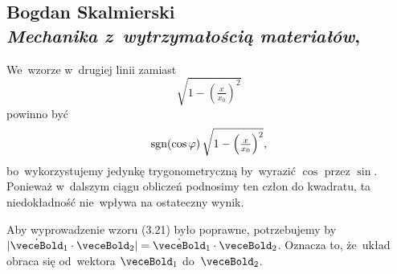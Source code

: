 \documentclass[a4paper,11pt]{article}
\numberwithin{equation}{section}
\begin{document}
\VerSpaceTwo













\newpage

\subsection{ %
  Bogdan Skalmierski \\
  \textit{Mechanika z~wytrzymałością materiałów},
  \cite{SkalmierskiMechanikaZWytrzymalosciaMaterialow1983}}

\vspace{0em}



\vspace{0em}


\noindent
{} We~wzorze w~drugiej linii zamiast
\begin{equation}
  \label{eq:Skalmierski-MechanikaZWytrzymalosciaETC-01}
  \sqrt{ 1 - \left( \tfrac{ x }{ x_{ 0 } } \right)^{ 2 } }
\end{equation}
powinno być
\begin{equation}
  \label{eq:SkalmierskiMechanikaZWytrzymaloscia-02}
  \textrm{sgn}( \cos \varphi ) \,
  \sqrt{ 1 - \left( \tfrac{ x }{ x_{ 0 } } \right)^{ 2 } },
\end{equation}
bo~wykorzystujemy jedynkę trygonometryczną by~wyrazić $\cos$ przez
$\sin$. Ponieważ w~dalszym ciągu obliczeń podnosimy ten człon do
kwadratu, ta niedokładność nie~wpływa na ostateczny wynik.

\VerSpaceFour





\noindent
{} Aby wyprowadzenie wzoru (3.21) było poprawne,
potrzebujemy by
$| \dot{ \veceBold }_{ 1 } \cdot \veceBold_{ 2 } | = \dot{ \veceBold }_{ 1 }
\cdot \veceBold_{ 2 }$. Oznacza to, że~układ obraca się od~wektora
$\veceBold_{ 1 }$ do~$\veceBold_{ 2 }$.





\newpage

\end{document}
